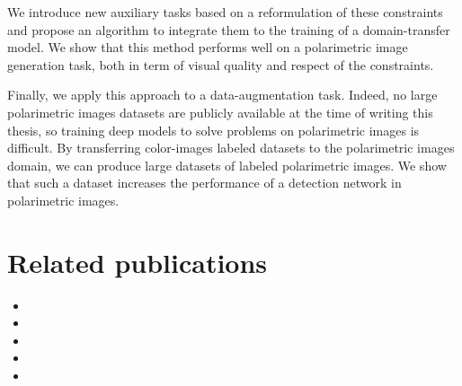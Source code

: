 We introduce new auxiliary tasks based on a reformulation of these constraints and propose an algorithm to integrate them to the training of a domain-transfer model. We show that this method performs well on a polarimetric image generation task, both in term of visual quality and respect of the constraints.

Finally, we apply this approach to a data-augmentation task. Indeed, no large polarimetric images datasets are publicly available at the time of writing this thesis, so training deep models to solve problems on polarimetric images is difficult. By transferring color-images labeled datasets to the polarimetric images domain, we can produce large datasets of labeled polarimetric images. We show that such a dataset increases the performance of a detection network in polarimetric images.

\newpage\clearpage

\section*{Related publications}

\begin{itemize}
	\item{}
	\item{}
	\item{}
	\item{}
	\item{}
\end{itemize}


\fancyhead[R]{}